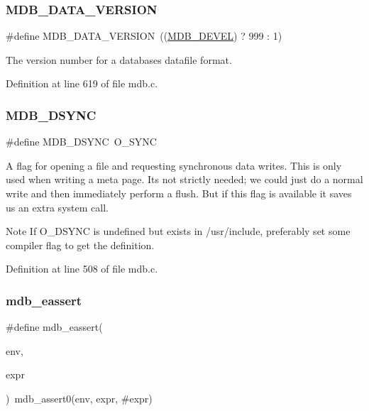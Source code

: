 \subsubsection{\texorpdfstring{M\+D\+B\+\_\+\+D\+A\+T\+A\+\_\+\+V\+E\+R\+S\+I\+ON}{MDB\_DATA\_VERSION}}
{\footnotesize\ttfamily \#define M\+D\+B\+\_\+\+D\+A\+T\+A\+\_\+\+V\+E\+R\+S\+I\+ON~((\mbox{\hyperlink{group__compat_ga103b045068a1d21bf2347a7342f8f486}{M\+D\+B\+\_\+\+D\+E\+V\+EL}}) ? 999 \+: 1)}

The version number for a database\textquotesingle{}s datafile format. 

Definition at line 619 of file mdb.\+c.

\mbox{\label{group__internal_gafda79679e03da9d0d26c8f6fd74d2f2f}} 
\subsubsection{\texorpdfstring{M\+D\+B\+\_\+\+D\+S\+Y\+NC}{MDB\_DSYNC}}
{\footnotesize\ttfamily \#define M\+D\+B\+\_\+\+D\+S\+Y\+NC~O\+\_\+\+S\+Y\+NC}

A flag for opening a file and requesting synchronous data writes. This is only used when writing a meta page. It\textquotesingle{}s not strictly needed; we could just do a normal write and then immediately perform a flush. But if this flag is available it saves us an extra system call.

\begin{DoxyNote}{Note}
If O\+\_\+\+D\+S\+Y\+NC is undefined but exists in /usr/include, preferably set some compiler flag to get the definition. 
\end{DoxyNote}


Definition at line 508 of file mdb.\+c.

\mbox{\label{group__internal_ga90d50765b3f12b8c239ab259f99ec243}} 
\subsubsection{\texorpdfstring{mdb\+\_\+eassert}{mdb\_eassert}}
{\footnotesize\ttfamily \#define mdb\+\_\+eassert(\begin{DoxyParamCaption}\item[{}]{env,  }\item[{}]{expr }\end{DoxyParamCaption})~mdb\+\_\+assert0(env, expr, \#expr)}

